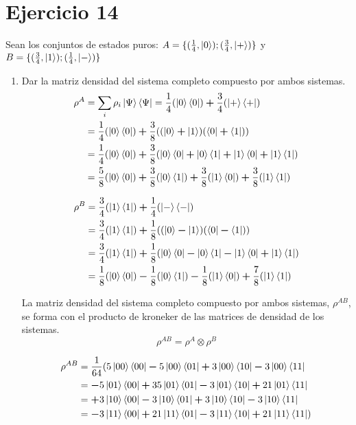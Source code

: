 \documentclass[a4paper]{article}
\begin{document}
\section {Ejercicio 14}
Sean los conjuntos de estados puros: $A= \{(\frac{1}{4}, \ket{0}); (\frac{3}{4}, \ket{+})\}$ y $B = \{(\frac{3}{4}, \ket{1}); (\frac{1}{4}, \ket{-})\}$\\
\begin{enumerate}[label=(\alph*)]
\item{Dar la matriz densidad del sistema completo compuesto por ambos sistemas.}\\

\begin{align*}
\rho^A &= \sum_{i} \rho_i \ket{\Psi} \bra{\Psi} = \frac{1}{4}(\ket{0}\bra{0}) \bm{+} \frac{3}{4}(\ket{+}\bra{+})\\
            &= \frac{1}{4}(\ket{0}\bra{0}) \bm{+}  \frac{3}{8}((\ket{0} \bm{+} \ket{1}) (\bra{0} \bm{+} \bra{1}))\\
            &= \frac{1}{4}(\ket{0}\bra{0}) \bm{+}  \frac{3}{8}( \ket{0}\bra{0} \bm{+} \ket{0}\bra{1} \bm{+} \ket{1}\bra{0} \bm{+} \ket{1}\bra{1})\\
            &= \frac{5}{8}(\ket{0}\bra{0}) \bm{+} \frac{3}{8}(\ket{0}\bra{1}) \bm{+} \frac{3}{8}(\ket{1}\bra{0}) \bm{+} \frac{3}{8}(\ket{1}\bra{1})
\end{align*}

\begin{align*}
\rho^B &= \frac{3}{4}(\ket{1}\bra{1}) \bm{+} \frac{1}{4}(\ket{-}\bra{-})\\
            &= \frac{3}{4}(\ket{1}\bra{1}) \bm{+}  \frac{1}{8}((\ket{0} \bm{-} \ket{1}) (\bra{0} \bm{-} \bra{1}))\\
            &= \frac{3}{4}(\ket{1}\bra{1}) \bm{+}  \frac{1}{8}( \ket{0}\bra{0} \bm{-} \ket{0}\bra{1} \bm{-} \ket{1}\bra{0} \bm{+} \ket{1}\bra{1})\\
            &= \frac{1}{8}(\ket{0}\bra{0}) \bm{-} \frac{1}{8}(\ket{0}\bra{1}) \bm{-} \frac{1}{8}(\ket{1}\bra{0}) \bm{+} \frac{7}{8}(\ket{1}\bra{1})
\end{align*}

La matriz densidad del sistema completo compuesto por ambos sistemas, $\rho^{AB}$, se forma con el producto de kroneker de las matrices de densidad de los sistemas.\\
\[
\rho^{AB} = \rho^A \otimes \rho^B
\]

\begin{align*}
\rho^{AB} &= \frac{1}{64}(5\ket{00}\bra{00} \bm{-} 5\ket{00}\bra{01} \bm{+} 3\ket{00}\bra{10} \bm{-} 3\ket{00}\bra{11}\\
	       &= \bm{-} 5\ket{01}\bra{00} \bm{+} 35\ket{01}\bra{01} \bm{-} 3\ket{01}\bra{10} \bm{+} 21\ket{01}\bra{11}\\
	       &= \bm{+} 3\ket{10}\bra{00} \bm{-} 3\ket{10}\bra{01} \bm{+} 3\ket{10}\bra{10} \bm{-} 3\ket{10}\bra{11}\\
	       &= \bm{-} 3\ket{11}\bra{00} \bm{+} 21\ket{11}\bra{01} \bm{-} 3\ket{11}\bra{10} \bm{+} 21\ket{11}\bra{11})
\end{align*}


\end{enumerate}
\end{document}

